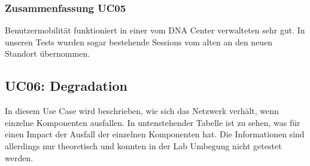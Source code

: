 \begin{landscape}
\subsubsection{Zusammenfassung UC05}
Benutzermobilität funktioniert in einer vom DNA Center verwalteten sehr gut. In unseren Tests wurden sogar bestehende Sessions vom alten an den neuen Standort übernommen. 
\pagebreak
\subsection{UC06: Degradation}
In diesem Use Case wird beschrieben, wie sich das Netzwerk verhält, wenn einzelne Komponenten ausfallen. In untenstehender Tabelle ist zu sehen, was für einen Impact der Ausfall der einzelnen Komponenten hat. Die Informationen sind allerdings nur theoretisch und konnten in der Lab Umbegung nicht getestet werden.
\\


\end{landscape}
